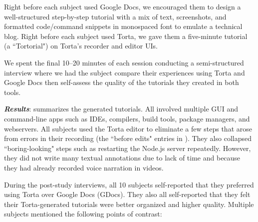 Right before each subject used Google Docs, we encouraged them to design a
well-structured step-by-step tutorial with a mix of text, screenshots,
and formatted code/command snippets in monospaced font to emulate a
technical blog. Right before each subject used Torta, we gave
them a five-minute tutorial (a ``Tortorial") on Torta's recorder and
editor UIs.

We spent the final 10--20 minutes of each session conducting a
semi-structured interview where we had the subject compare their
experiences using Torta and Google Docs then self-assess the quality of
the tutorials they created in both tools.


\emph{\textbf{Results}}:  summarizes the
generated tutorials. All involved multiple GUI and command-line apps
such as IDEs, compilers, build tools, package managers, and webservers.
%
All subjects used the Torta editor to eliminate a few steps that arose
from errors in their recording (the ``before edits" entries in
). They also collapsed ``boring-looking" steps
such as restarting the Node.js server repeatedly. However, they did not
write many textual annotations due to lack of time and because they
had already recorded voice narration in videos.

During the post-study interviews, all
10 subjects self-reported that they preferred using Torta over Google
Docs (GDocs). They also all
self-reported that they felt their Torta-generated tutorials were better organized
and higher quality. Multiple subjects mentioned the following points of
contrast:

